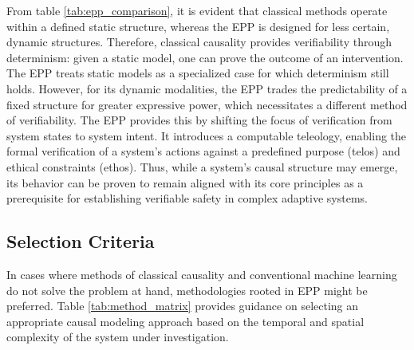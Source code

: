 From table \ref{tab:epp_comparison}, it is evident that classical methods operate within a defined static structure, whereas the EPP is designed for less certain, dynamic structures. Therefore, classical causality provides verifiability through determinism: given a static model, one can prove the outcome of an intervention. The EPP treats static models as a specialized case for which determinism still holds. However, for its dynamic modalities, the EPP trades the predictability of a fixed structure for greater expressive power, which necessitates a different method of verifiability. The EPP provides this by shifting the focus of verification from system states to system intent. It introduces a computable teleology, enabling the formal verification of a system's actions against a predefined purpose (telos) and ethical constraints (ethos). Thus, while a system's causal structure may emerge, its behavior can be proven to remain aligned with its core principles as a prerequisite for establishing verifiable safety in complex adaptive systems.

\subsection{Selection Criteria}

In cases where methods of classical causality and conventional machine learning do not solve the problem at hand, methodologies rooted in EPP might be preferred. Table \ref{tab:method_matrix} provides guidance on selecting an appropriate causal modeling approach based on the temporal and spatial complexity of the system under investigation.

